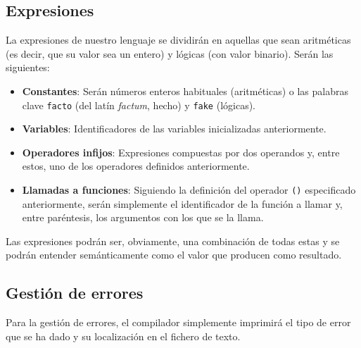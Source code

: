 \subsection{Expresiones}
La expresiones de nuestro lenguaje se dividirán en aquellas que sean aritméticas
(es decir, que su valor sea un entero) y lógicas (con valor binario). Serán las
siguientes:
\begin{itemize}
    \item \textbf{Constantes}: Serán números enteros habituales (aritméticas) o
        las palabras clave \lstinline{facto} (del latín \textit{factum}, hecho) y \lstinline{fake} (lógicas).
    \item \textbf{Variables}: Identificadores de las variables inicializadas
        anteriormente.
    \item \textbf{Operadores infijos}: Expresiones compuestas por dos operandos
        y, entre estos, uno de los operadores definidos anteriormente.
    \item \textbf{Llamadas a funciones}: Siguiendo la definición del operador
        \lstinline{()} especificado anteriormente, serán simplemente el
        identificador de la función a llamar y, entre paréntesis, los argumentos
        con los que se la llama.
\end{itemize}
Las expresiones podrán ser, obviamente, una combinación de todas estas y se
podrán entender semánticamente como el valor que producen como resultado.

\subsection{Gestión de errores}
Para la gestión de errores, el compilador simplemente imprimirá el tipo de error
que se ha dado y su localización en el fichero de texto.
